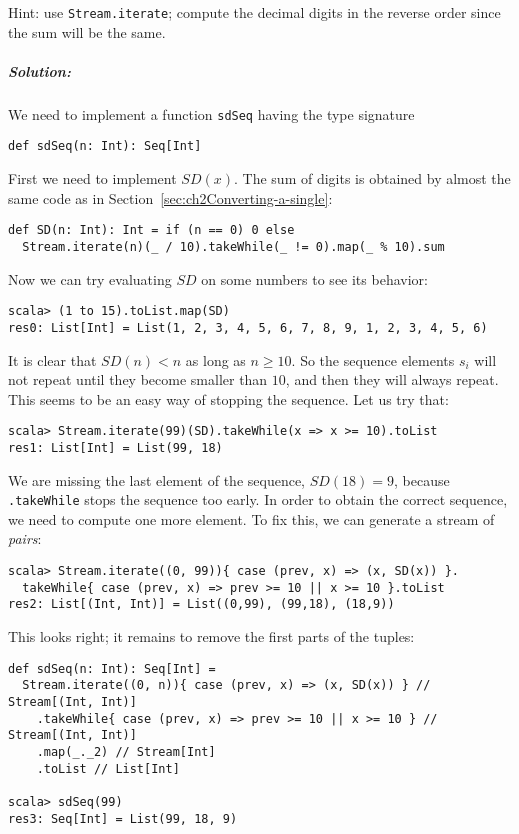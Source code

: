Hint: use \lstinline!Stream.iterate!;
compute the decimal digits in the reverse order since the sum will
be the same.

\subparagraph{Solution:}

We need to implement a function \lstinline!sdSeq!
having the type signature
\begin{lstlisting}
def sdSeq(n: Int): Seq[Int]
\end{lstlisting}
First we need to implement $SD(x)$. The sum of digits is obtained
by almost the same code as in Section~\ref{sec:ch2Converting-a-single}:
\begin{lstlisting}
def SD(n: Int): Int = if (n == 0) 0 else
  Stream.iterate(n)(_ / 10).takeWhile(_ != 0).map(_ % 10).sum
\end{lstlisting}
Now we can try evaluating $SD$ on some numbers to see its behavior:
\begin{lstlisting}
scala> (1 to 15).toList.map(SD)
res0: List[Int] = List(1, 2, 3, 4, 5, 6, 7, 8, 9, 1, 2, 3, 4, 5, 6)
\end{lstlisting}
It is clear that $SD(n)<n$ as long as $n\geq10$. So the sequence
elements $s_{i}$ will not repeat until they become smaller than $10$,
and then they will always repeat. This seems to be an easy way of
stopping the sequence. Let us try that:
\begin{lstlisting}
scala> Stream.iterate(99)(SD).takeWhile(x => x >= 10).toList
res1: List[Int] = List(99, 18)
\end{lstlisting}
We are missing the last element of the sequence, $SD(18)=9$, because
\lstinline!.takeWhile!
stops the sequence too early. In order to obtain the correct sequence,
we need to compute one more element. To fix this, we can generate
a stream of \emph{pairs}:
\begin{lstlisting}
scala> Stream.iterate((0, 99)){ case (prev, x) => (x, SD(x)) }.
  takeWhile{ case (prev, x) => prev >= 10 || x >= 10 }.toList
res2: List[(Int, Int)] = List((0,99), (99,18), (18,9))
\end{lstlisting}
This looks right; it remains to remove the first parts of the tuples:
\begin{lstlisting}
def sdSeq(n: Int): Seq[Int] =
  Stream.iterate((0, n)){ case (prev, x) => (x, SD(x)) } // Stream[(Int, Int)]
    .takeWhile{ case (prev, x) => prev >= 10 || x >= 10 } // Stream[(Int, Int)]
    .map(_._2) // Stream[Int]
    .toList // List[Int]

scala> sdSeq(99)
res3: Seq[Int] = List(99, 18, 9)
\end{lstlisting}


